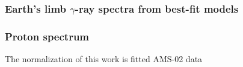 \documentclass{beamer}
\begin{document}
\begin{frame}
\frametitle{Earth's limb $\gamma$-ray spectra from best-fit models}

\begin{figure}
\end{figure}


\end{frame}
\begin{frame}
  \frametitle{Proton spectrum}
  
  \begin{figure}[h!]
  \end{figure}
\tiny The normalization of this work is fitted AMS-02 data  
\end{frame}
\end{document}
